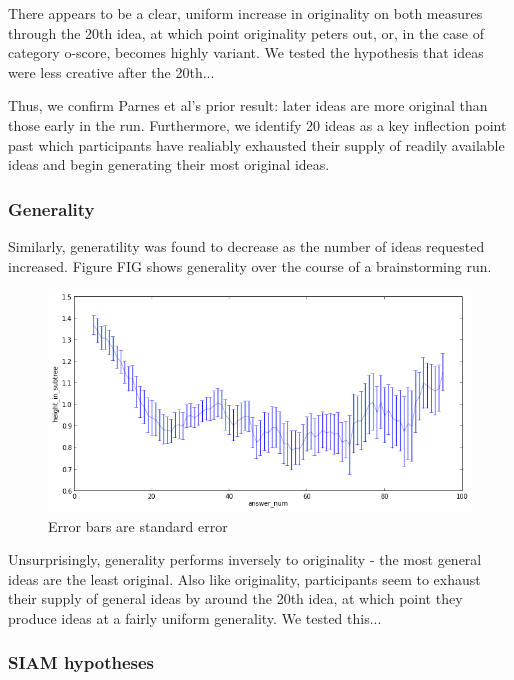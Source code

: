 There appears to be a clear, uniform increase in originality on both measures through the 20th idea, at which point originality peters out, or, in the case of category o-score, becomes highly variant. We tested the hypothesis that ideas were less creative after the 20th...

Thus, we confirm Parnes et al's prior result: later ideas are more original than those early in the run. Furthermore, we identify 20 ideas as a key inflection point past which participants have realiably exhausted their supply of readily available ideas and begin generating their most original ideas.

\subsubsection{Generality}

Similarly, generatility was found to decrease as the number of ideas requested increased. Figure FIG shows generality over the course of a brainstorming run.

\begin{figure}[h]
    \centering
    \includegraphics[width=0.9\columnwidth]{run_height_in_subtree}
    \caption{Error bars are standard error}
\end{figure}

Unsurprisingly, generality performs inversely to originality - the most general ideas are the least original. Also like originality, participants seem to exhaust their supply of general ideas by around the 20th idea, at which point they produce ideas at a fairly uniform generality. We tested this...

\subsubsection{SIAM hypotheses}

\cite{nijstad_how_2006}